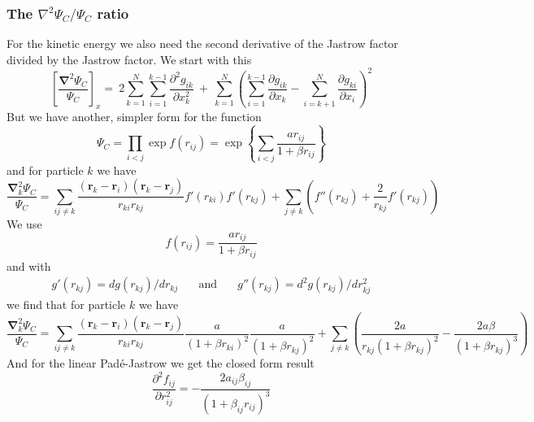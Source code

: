 \documentclass[11pt]{article}
\begin{document}
	\subsubsection{The $\nabla^{2} \Psi_{C}/\Psi_{C}$ ratio}
		For the kinetic energy we also need the second derivative of the Jastrow
		factor divided by the Jastrow factor. We start with this
		\[
		\left[\frac{\mathbf{\nabla}^{2}\Psi_{C}}{\Psi_{C}}\right]_{x}=\ 2\sum_{k=1}^{N}\sum_{i=1}^{k-1}\frac{\partial^{2}g_{ik}}{\partial x_{k}^{2}}\ +\ \sum_{k=1}^{N}\left(\sum_{i=1}^{k-1}\frac{\partial g_{ik}}{\partial x_{k}}-\sum_{i=k+1}^{N}\frac{\partial g_{ki}}{\partial x_{i}}\right)^{2}
		\]
		But we have another, simpler form for the function
		\[
		\Psi_{C}=\prod_{i<j}\exp f(r_{ij})=\exp\left\{ \sum_{i<j}\frac{ar_{ij}}{1+\beta r_{ij}}\right\} 
		\]
		and for particle $k$ we have
		\[
		\frac{\mathbf{\nabla}_{k}^{2}\Psi_{C}}{\Psi_{C}}=\sum_{ij\ne k}\frac{(\mathbf{r}_{k}-\mathbf{r}_{i})(\mathbf{r}_{k}-\mathbf{r}_{j})}{r_{ki}r_{kj}}f'(r_{ki})f'(r_{kj})+\sum_{j\ne k}\left(f''(r_{kj})+\frac{2}{r_{kj}}f'(r_{kj})\right)
		\]
		We use 
		\[
		f(r_{ij})=\frac{ar_{ij}}{1+\beta r_{ij}}
		\]
		and with
		\[
		\begin{array}{ccc}
		g'(r_{kj})=dg(r_{kj})/dr_{kj} & \quad\mbox{and}\quad & g''(r_{kj})=d^{2}g(r_{kj})/dr_{kj}^{2}\end{array}
		\]
		we find that for particle $k$ we have
		\[
		\frac{\mathbf{\nabla}_{k}^{2}\Psi_{C}}{\Psi_{C}}=\sum_{ij\ne k}\frac{(\mathbf{r}_{k}-\mathbf{r}_{i})(\mathbf{r}_{k}-\mathbf{r}_{j})}{r_{ki}r_{kj}}\frac{a}{(1+\beta r_{ki})^{2}}\frac{a}{(1+\beta r_{kj})^{2}}+\sum_{j\ne k}\left(\frac{2a}{r_{kj}(1+\beta r_{kj})^{2}}-\frac{2a\beta}{(1+\beta r_{kj})^{3}}\right)
		\]
		And for the linear Padé-Jastrow we get the closed form result 
		\[
		\frac{\partial^{2}f_{ij}}{\partial r_{ij}^{2}}=-\frac{2a_{ij}\beta_{ij}}{\left(1+\beta_{ij}r_{ij}\right)^{3}}
		\]
\end{document}
